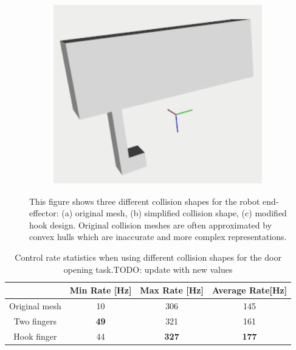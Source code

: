 \begin{figure}[t]
\hfill
\begin{subfigure}{0.3\columnwidth}
    \includegraphics[width=\linewidth]{figures/single_hook_cropped.pdf}
    \caption{}
\end{subfigure}
\hfill
\caption{This figure shows three different collision shapes for the robot end-effector: (a) original mesh, (b) simplified collision shape, (c) modified hook design. Original collision meshes are often approximated by convex hulls which are inaccurate and more complex representations.}\label{fig:1}
\end{figure}


\begin{table}[h!]
    \centering
    \begin{tabular}{c|c|c|c}
             &  Min Rate [Hz] & Max Rate [Hz]& Average Rate[Hz]\\
                       \hline
         Original mesh & 10 & 306 & 145 \\
         Two fingers & \textbf{49} & 321 & 161 \\
         Hook finger & 44 & \textbf{327} & \textbf{177} \\
    \end{tabular}
    \caption{Control rate statistics when using different collision shapes for the door opening task.TODO: update with new values}
    \label{tab:rate_stat}
\end{table}

 
